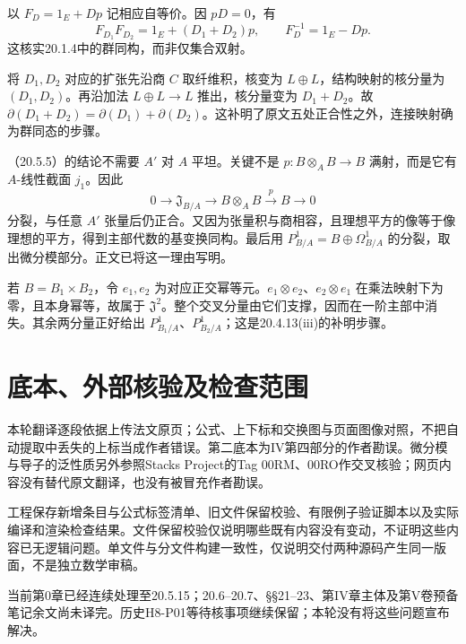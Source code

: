 以 $F_D=1_E+D p$ 记相应自等价。因 $pD=0$，有
\[
 F_{D_1}F_{D_2}=1_E+(D_1+D_2)p,
 \qquad F_D^{-1}=1_E-Dp.
\]
这核实20.1.4中的群同构，而非仅集合双射。

将 $D_1,D_2$ 对应的扩张先沿商 $C$ 取纤维积，核变为 $L\oplus L$，结构映射的核分量为 $(D_1,D_2)$。再沿加法 $L\oplus L\to L$ 推出，核分量变为 $D_1+D_2$。故 $\partial(D_1+D_2)=\partial(D_1)+\partial(D_2)$。这补明了原文五处正合性之外，连接映射确为群同态的步骤。

（20.5.5）的结论不需要 $A'$ 对 $A$ 平坦。关键不是 $p:B\otimes_A B\to B$ 满射，而是它有 $A$-线性截面 $j_1$。因此
\[
 0\longrightarrow\mathfrak J_{B/A}\longrightarrow B\otimes_A B
 \xrightarrow p B\longrightarrow0
\]
分裂，与任意 $A'$ 张量后仍正合。又因为张量积与商相容，且理想平方的像等于像理想的平方，得到主部代数的基变换同构。最后用 $P^1_{B/A}=B\oplus\Omega^1_{B/A}$ 的分裂，取出微分模部分。正文已将这一理由写明。

若 $B=B_1\times B_2$，令 $e_1,e_2$ 为对应正交幂等元。$e_1\otimes e_2$、$e_2\otimes e_1$ 在乘法映射下为零，且本身幂等，故属于 $\mathfrak J^2$。整个交叉分量由它们支撑，因而在一阶主部中消失。其余两分量正好给出 $P^1_{B_1/A}$、$P^1_{B_2/A}$；这是20.4.13(iii)的补明步骤。

\section*{底本、外部核验及检查范围}
本轮翻译逐段依据上传法文原页；公式、上下标和交换图与页面图像对照，不把自动提取中丢失的上标当成作者错误。第二底本为IV第四部分的作者勘误。微分模与导子的泛性质另外参照Stacks Project的Tag 00RM、00RO作交叉核验；网页内容没有替代原文翻译，也没有被冒充作者勘误。

工程保存新增条目与公式标签清单、旧文件保留校验、有限例子验证脚本以及实际编译和渲染检查结果。文件保留校验仅说明哪些既有内容没有变动，不证明这些内容已无逻辑问题。单文件与分文件构建一致性，仅说明交付两种源码产生同一版面，不是独立数学审稿。

当前第0章已经连续处理至20.5.15；20.6--20.7、§§21--23、第IV章主体及第V卷预备笔记余文尚未译完。历史H8-P01等待核事项继续保留；本轮没有将这些问题宣布解决。
